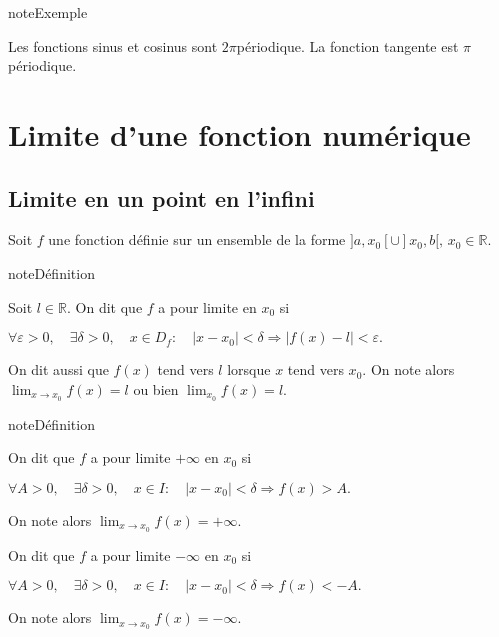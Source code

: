 \documentclass[letterpaper,10pt,french]{jupyterBook}
\begin{document}
\begin{sphinxadmonition}{note}{Exemple}

\sphinxAtStartPar
Les fonctions sinus et cosinus sont \(2\pi\)\sphinxhyphen{}périodique. La fonction tangente est \(\pi\)\sphinxhyphen{}périodique.
\end{sphinxadmonition}


\section{Limite d’une fonction numérique}
\label{\detokenize{limitefcts:limite-d-une-fonction-numerique}}

\subsection{Limite en un point en l’infini}
\label{\detokenize{limitefcts:limite-en-un-point-en-l-infini}}
\sphinxAtStartPar
Soit \(f\) une fonction définie sur un ensemble de la forme \(]a,x_0[\cup ]x_0,b[,\,x_0\in \mathbb{R}.\)

\begin{sphinxadmonition}{note}{Définition}

\sphinxAtStartPar
Soit \(l\in \mathbb{R}.\) On dit que \(f\) a pour limite en \(x_0\) si

\sphinxAtStartPar
\(\forall \varepsilon>0,\quad \exists \delta>0, \quad x\in D_f:\quad |x-x_0|<\delta\Rightarrow |f(x)-l|<\varepsilon.\)

\sphinxAtStartPar
On dit aussi que \(f(x)\) tend vers \(l\) lorsque \(x\) tend vers \(x_0.\) On note alors \(\lim_{x\rightarrow x_0}f(x)=l\) ou bien \(\lim_{x_0}f(x)=l.\)
\end{sphinxadmonition}

\begin{sphinxadmonition}{note}{Définition}

\sphinxAtStartPar
On dit que \(f\) a pour limite \(+\infty\) en \(x_0\) si

\sphinxAtStartPar
\(\forall A>0, \quad \exists \delta>0, \quad x\in I:\quad |x-x_0|<\delta\Rightarrow f(x)>A.\)

\sphinxAtStartPar
On note alors \(\lim_{x\rightarrow x_0}f(x)=+\infty.\)

\sphinxAtStartPar
On dit que \(f\) a pour limite \(-\infty\) en \(x_0\) si

\sphinxAtStartPar
\(\forall A>0, \quad \exists \delta>0, \quad x\in I:\quad |x-x_0|<\delta\Rightarrow f(x)<-A.\)

\sphinxAtStartPar
On note alors \(\lim_{x\rightarrow x_0}f(x)=-\infty.\)
\end{sphinxadmonition}
\end{document}
